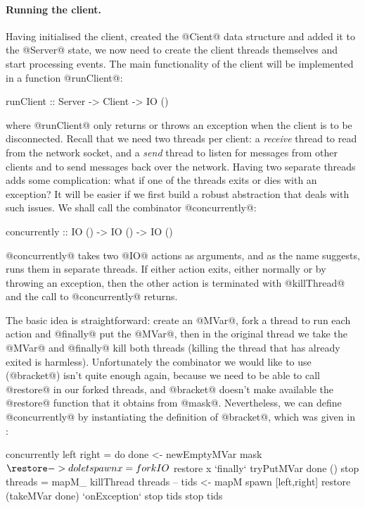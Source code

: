\paragraph{Running the client.} Having initialised the client, created
the @Cient@ data structure and added it to the @Server@ state, we now
need to create the client threads themselves and start processing
events.  The main functionality of the client will be implemented in a
function @runClient@:

\begin{haskell}
runClient :: Server -> Client -> IO ()
\end{haskell}

\noindent where @runClient@ only returns or throws an exception when
the client is to be disconnected.  Recall that we need two threads per
client: a \emph{receive} thread to read from the network socket, and a
\emph{send} thread to listen for messages from other clients and to
send messages back over the network.  Having two separate threads adds
some complication: what if one of the threads exits or dies with an
exception?  It will be easier if we first build a robust abstraction
that deals with such issues.  We shall call the combinator
@concurrently@:

\begin{haskell}
concurrently :: IO () -> IO () -> IO ()
\end{haskell}

\noindent @concurrently@ takes two @IO@ actions as arguments, and as
the name suggests, runs them in separate threads.  If either action
exits, either normally or by throwing an exception, then the other
action is terminated with @killThread@ and the call to @concurrently@
returns.

The basic idea is straightforward: create an @MVar@, fork a thread to
run each action and @finally@ put the @MVar@, then in the original
thread we take the @MVar@ and @finally@ kill both threads (killing the
thread that has already exited is harmless).  Unfortunately the
combinator we would like to use (@bracket@) isn't quite enough again,
because we need to be able to call @restore@ in our forked threads,
and @bracket@ doesn't make available the @restore@ function that it
obtains from @mask@.  Nevertheless, we can define @concurrently@ by
instantiating the definition of @bracket@, which was given in
:

\begin{haskell}
concurrently left right = do
    done <- newEmptyMVar
    mask $ \restore -> do
        let
            spawn x = forkIO $ restore x `finally` tryPutMVar done ()
            stop threads = mapM_ killThread threads
        --
        tids <- mapM spawn [left,right]
        restore (takeMVar done) `onException` stop tids
        stop tids
\end{haskell}

